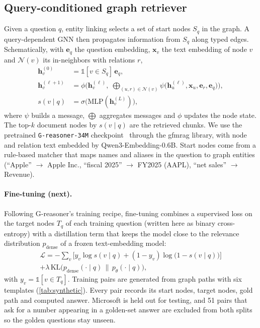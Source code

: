 \documentclass[10pt,twocolumn,letterpaper]{article}
\begin{document}
\subsection{Query-conditioned graph retriever}
\label{sec:retriever}
Given a question $q$, entity linking selects a set of start nodes $S_q$ in the graph. A
query-dependent GNN then propagates information from $S_q$ along typed edges. Schematically, with
$\mathbf{e}_q$ the question embedding, $\mathbf{x}_v$ the text embedding of node $v$ and
$\mathcal{N}(v)$ its in-neighbors with relations $r$,
\begin{align}
  \mathbf{h}_v^{(0)} &= \mathbb{1}[v \in S_q]\,\mathbf{e}_q, \label{eq:init}\\
  \mathbf{h}_v^{(\ell+1)} &= \phi\Big(\mathbf{h}_v^{(\ell)},\;
     \textstyle\bigoplus_{(u,r)\in\mathcal{N}(v)} \psi\big(\mathbf{h}_u^{(\ell)}, \mathbf{x}_u,
     \mathbf{e}_r, \mathbf{e}_q\big)\Big), \label{eq:mp}\\
  s(v \mid q) &= \sigma\big(\mathrm{MLP}(\mathbf{h}_v^{(L)})\big), \label{eq:score}
\end{align}
where $\psi$ builds a message, $\bigoplus$ aggregates messages and $\phi$ updates the node state. The
top-$k$ document nodes by $s(v\mid q)$ are the retrieved chunks. We use the pretrained
\texttt{G-reasoner-34M} checkpoint~\cite{luo2026greasoner} through the gfmrag library, with node and
relation text embedded by Qwen3-Embedding-0.6B. Start nodes come from a rule-based matcher that maps
names and aliases in the question to graph entities (\eg ``Apple'' $\rightarrow$ Apple Inc.,
``fiscal 2025'' $\rightarrow$ FY2025 (AAPL), ``net sales'' $\rightarrow$ Revenue).

\paragraph{Fine-tuning (next).}
Following G-reasoner's training recipe, fine-tuning combines a supervised loss on the target nodes
$T_q$ of each training question (written here as binary cross-entropy) with a distillation term that keeps the model close to the
relevance distribution $p_{\text{dense}}$ of a frozen text-embedding model:
\begin{multline}
  \mathcal{L} = -\sum_{v} \Big[y_v \log s(v\mid q) + (1-y_v)\log\big(1-s(v\mid q)\big)\Big]\\
  + \lambda\, \mathrm{KL}\big(p_{\text{dense}}(\cdot\mid q)\,\|\,p_\theta(\cdot\mid q)\big),
  \label{eq:loss}
\end{multline}
with $y_v = \mathbb{1}[v\in T_q]$. Training pairs are generated from graph paths with six templates
(\cref{tab:synthetic}). Every pair records its start nodes, target nodes, gold path and computed
answer. Microsoft is held out for testing, and 51 pairs that ask for a number appearing in a
golden-set answer are excluded from both splits so the golden questions stay unseen.
\end{document}
